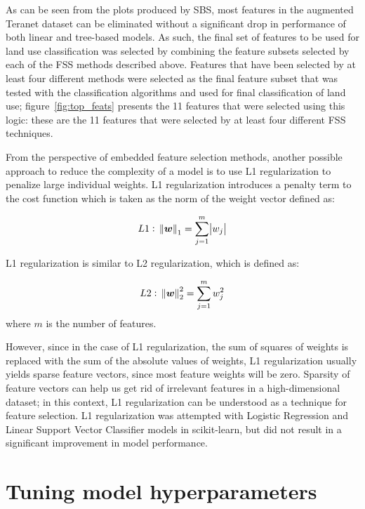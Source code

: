 As can be seen from the plots produced by SBS, most features in the augmented Teranet dataset can be eliminated without a significant drop in performance of both linear and tree-based models.
As such, the final set of features to be used for land use classification was selected by combining the feature subsets selected by each of the FSS methods described above.
Features that have been selected by at least four different methods were selected as the final feature subset that was tested with the classification algorithms and used for final classification of land use;
figure~\ref{fig:top_feats} presents the 11 features that were selected using this logic: these are the 11 features that were selected by at least four different FSS techniques.

From the perspective of embedded feature selection methods, another possible approach to reduce the complexity of a model is to use L1 regularization to penalize large individual weights.
L1 regularization introduces a penalty term to the cost function which is taken as the norm of the weight vector defined as:

\begin{equation} \label{eq:l1_regularization}
    L1:~\norm{\boldsymbol{w}}_1 = \sum \limits_{j=1}^m \abs{w_j}
\end{equation}

L1 regularization is similar to L2 regularization, which is defined as:

\begin{equation} \label{eq:l2_regularization}
    L2:~\norm{\boldsymbol{w}}_2^2 = \sum \limits_{j=1}^m w_j^2
\end{equation}
where $m$ is the number of features.

However, since in the case of L1 regularization, the sum of squares of weights is replaced with the sum of the absolute values of weights, L1 regularization usually yields sparse feature vectors, since most feature weights will be zero\cite{RaschkaMirjalili2017,Scikit-learndevelopers2019}.
Sparsity of feature vectors can help us get rid of irrelevant features in a high-dimensional dataset;
in this context, L1 regularization can be understood as a technique for feature selection\cite{RaschkaMirjalili2017}.
L1 regularization was attempted with Logistic Regression and Linear Support Vector Classifier models in scikit-learn, but did not result in a significant improvement in model performance.

\section{Tuning model hyperparameters} \label{sec:tuning_hyperparameters}

